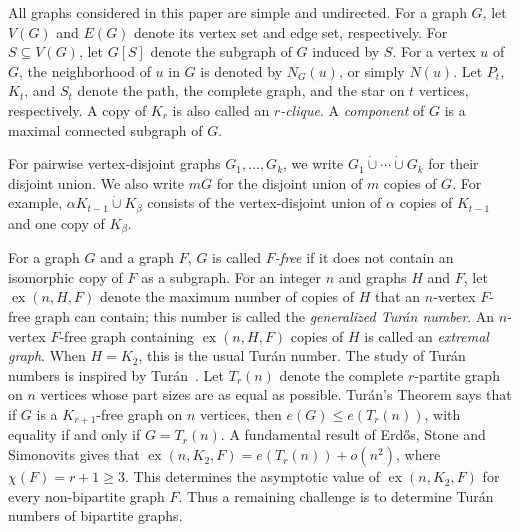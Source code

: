 \documentclass[11pt,a4paper]{article}
\newcommand{\ex}{\operatorname{ex}}
\newcommand{\dunion}{\mathbin{\dot\cup}}
\begin{document}
All graphs considered in this paper are simple and undirected.
For a graph $G$, let $V(G)$ and $E(G)$ denote its vertex set and edge set, respectively.
For $S\subseteq V(G)$, let $G[S]$ denote the subgraph of $G$ induced by $S$.
For a vertex $u$ of $G$, the neighborhood of $u$ in $G$ is denoted by $N_G(u)$, or simply $N(u)$.
Let $P_t$, $K_t$, and $S_t$ denote the path, the complete graph, and the star on $t$ vertices, respectively. A copy of $K_r$ is also called an {\em $r$-clique}.
A {\em component} of $G$ is a maximal connected subgraph of $G$.

For pairwise vertex-disjoint graphs \(G_1,\ldots,G_k\), we write
$G_1\dunion\cdots\dunion G_k$ for their disjoint union. We also write \(mG\) for the disjoint union of \(m\) copies of \(G\). For example, \(\alpha K_{t-1}\dunion K_\beta\) consists of the vertex-disjoint union of \(\alpha\) copies of \(K_{t-1}\) and one copy of \(K_\beta\).


For a graph $G$ and a graph $F$,
$G$ is called {\em $F$-free} if it does not contain an isomorphic copy of $F$ as a subgraph. For an integer $n$ and graphs $H$ and $F$, let $\ex(n,H,F)$ denote the maximum number of copies of $H$ that an $n$-vertex $F$-free graph can contain; this number is called the {\em generalized Tur\'{a}n number}. An $n$-vertex $F$-free graph containing $\ex(n,H,F)$ copies of $H$ is called an {\em extremal graph}.
When $H=K_{2}$, this is the usual Tur\'{a}n number. The study of Tur\'{a}n numbers is inspired by Tur\'{a}n~\cite{t1941}. Let $T_r(n)$ denote the complete $r$-partite graph on $n$ vertices whose part sizes are as equal as possible. Tur\'{a}n's Theorem \cite{t1941} says that if $G$ is a $K_{r+1}$-free graph on $n$ vertices, then $e(G)\le e(T_r(n))$, with equality if and only if $G=T_r(n)$. A fundamental result of Erd\H{o}s, Stone and Simonovits \cite{ES46, ES66} gives that $\ex(n,K_2,F)=e(T_r(n))+o(n^2)$, where $\chi(F)=r+1\ge3$. This determines the asymptotic value of $\ex(n,K_2,F)$ for every non-bipartite graph $F$. Thus a remaining challenge is to determine Tur\'{a}n numbers of bipartite graphs.
\end{document}
